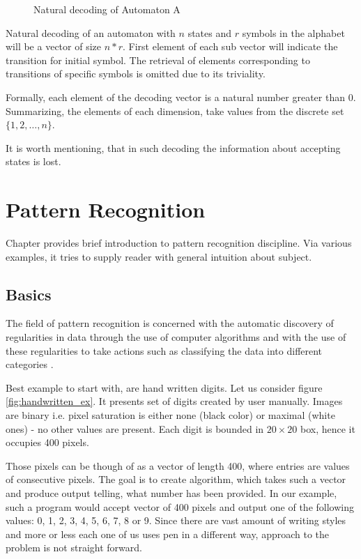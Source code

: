 \documentclass{mini}
\begin{document}
\begin{figure}[H]
\begin{center}
        \caption{Natural decoding of Automaton A}
        \label{fig:encoding}
    \end{center}
\end{figure}

Natural decoding of an automaton with $n$ states and $r$ symbols in the alphabet will be a vector of size $n*r$. First element of each sub vector will indicate the transition for initial symbol. The retrieval of elements corresponding to transitions of specific symbols is omitted due to its triviality.

Formally, each element of the decoding vector is a natural number greater than 0. Summarizing, the elements of each dimension, take values from the discrete set $\{1,2, \ldots, n\}$.

It is worth mentioning, that in such decoding the information about accepting states is lost.


\chapter{Pattern Recognition} \label{chap:patt_rec}

Chapter provides brief introduction to pattern recognition discipline. Via various examples, it tries to supply reader with general intuition about subject.


\section{Basics}

The field of pattern recognition is concerned with the automatic discovery of regularities in data through the use of computer algorithms and with the use of these regularities to take actions such as classifying the data into different categories \cite{bishop_book}.

Best example to start with, are hand written digits. Let us consider figure \ref{fig:handwritten_ex}. It presents set of digits created by user manually. Images are binary i.e. pixel saturation is either none (black color) or maximal (white ones) - no other values are present. Each digit is bounded in $20 \times 20$ box, hence it occupies 400 pixels. 

Those pixels can be though of as a vector of length 400, where entries are values of consecutive pixels. The goal is to create algorithm, which takes such a vector and produce output telling, what number has been provided. In our example, such a program would accept vector of 400 pixels and output one of the following values: 0, 1, 2, 3, 4, 5, 6, 7, 8 or 9. Since there are vast amount of writing styles and more or less each one of us uses pen in a different way, approach to the problem is not straight forward. 
\end{document}
